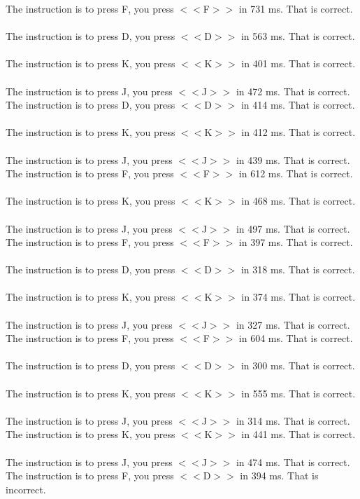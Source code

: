 \documentclass[pdflatex,sn-nature]{sn-jnl}%
\theoremstyle{thmstyleone}%
\theoremstyle{thmstyletwo}%
\theoremstyle{thmstylethree}%
\begin{document}
The instruction is to press F, you press $<<$F$>>$ in 731 ms. That is correct. $~$\\ 
The instruction is to press D, you press $<<$D$>>$ in 563 ms. That is correct. $~$\\ 
The instruction is to press K, you press $<<$K$>>$ in 401 ms. That is correct. $~$\\ 
The instruction is to press J, you press $<<$J$>>$ in 472 ms. That is correct. $~$\\ 
The instruction is to press D, you press $<<$D$>>$ in 414 ms. That is correct. $~$\\ 
The instruction is to press K, you press $<<$K$>>$ in 412 ms. That is correct. $~$\\ 
The instruction is to press J, you press $<<$J$>>$ in 439 ms. That is correct. $~$\\ 
The instruction is to press F, you press $<<$F$>>$ in 612 ms. That is correct. $~$\\ 
The instruction is to press K, you press $<<$K$>>$ in 468 ms. That is correct. $~$\\ 
The instruction is to press J, you press $<<$J$>>$ in 497 ms. That is correct. $~$\\ 
The instruction is to press F, you press $<<$F$>>$ in 397 ms. That is correct. $~$\\ 
The instruction is to press D, you press $<<$D$>>$ in 318 ms. That is correct. $~$\\ 
The instruction is to press K, you press $<<$K$>>$ in 374 ms. That is correct. $~$\\ 
The instruction is to press J, you press $<<$J$>>$ in 327 ms. That is correct. $~$\\ 
The instruction is to press F, you press $<<$F$>>$ in 604 ms. That is correct. $~$\\ 
The instruction is to press D, you press $<<$D$>>$ in 300 ms. That is correct. $~$\\ 
The instruction is to press K, you press $<<$K$>>$ in 555 ms. That is correct. $~$\\ 
The instruction is to press J, you press $<<$J$>>$ in 314 ms. That is correct. $~$\\ 
The instruction is to press K, you press $<<$K$>>$ in 441 ms. That is correct. $~$\\ 
The instruction is to press J, you press $<<$J$>>$ in 474 ms. That is correct. $~$\\ 
The instruction is to press F, you press $<<$D$>>$ in 394 ms. That is incorrect. $~$\\ 
\end{document}
